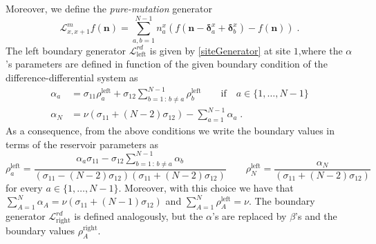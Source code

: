 \documentclass[10pt]{article}
\numberwithin{equation}{section}
\numberwithin{equation}{subsection}
\newtheorem{remark}{Remark}
\newcommand{\dt}{\;.}
\begin{document}
Moreover, we define the \textit{pure-mutation} generator
\begin{equation}
	\mathcal{L}_{x,x+1}^{m}f(\bm{n})=\sum_{a,b=1}^{N-1}n_{a}^{x}\left(f(\bm{n}-\bm{\delta}_{a}^{x}+\bm{\delta}_{b}^{x})-f(\bm{n})\right)\dt
\end{equation}
The left boundary generator $\mathcal{L}_{\text{left}}^{rd}$ is given by \eqref{siteGenerator} at site $1$,where the $\alpha$'s parameters are defined in function of the given boundary condition of the difference-differential system as
\begin{align}\label{boundaryParamRD}
		\alpha_{a}&=\sigma_{11}\rho_{a}^{\text{left}}+\sigma_{12}\sum_{b=1\,:\,b\neq a}^{N-1}\rho_{b}^{\text{left}}\qquad \text{if} \quad a\in \{1,\ldots,N-1\}\nonumber\\
		\alpha_{N}&=\nu\left(\sigma_{11}+(N-2)\sigma_{12}\right)-\sum_{a=1}^{N-1}\alpha_{a}\dt
\end{align}
As a consequence, from the above conditions we write the boundary values in terms of the reservoir parameters as
\begin{equation}
	\rho_{a}^{\text{left}}=\frac{\alpha_{a}\sigma_{11}-\sigma_{12}\sum_{b=1\,:\,b\neq a}^{N-1}\alpha_{b}}{(\sigma_{11}-(N-2)\sigma_{12})(\sigma_{11}+(N-2)\sigma_{12})}\qquad \rho_{N}^{\text{left}}=\frac{\alpha_{N}}{(\sigma_{11}+(N-2)\sigma_{12})}
\end{equation}
for every $a\in\{1,\ldots,N-1\}$. Moreover, with this choice we have that $\sum_{A=1}^{N}\alpha_{A}=\nu(\sigma_{11}+(N-1)\sigma_{12})$ and $\sum_{A=1}^{N}\rho_{A}^{\text{left}}=\nu$. 
The boundary generator $\mathcal{L}_{\text{right}}^{rd}$ is defined analogously, but the $\alpha$'s are replaced by $\beta$'s and the boundary values $\rho_{A}^{\text{right}}$.
\end{document}
